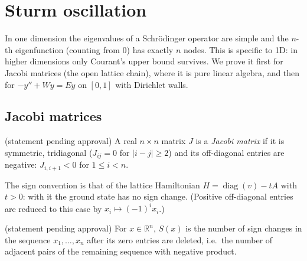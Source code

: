 \chapter{Sturm oscillation}
\label{chap:sturm}


In one dimension the eigenvalues of a Schrödinger operator are simple and the $n$-th eigenfunction (counting from
$0$) has exactly $n$ nodes. This is specific to 1D: in higher dimensions only Courant's upper bound survives. We prove
it first for Jacobi matrices (the open lattice chain), where it is pure linear algebra, and then for
$-y''+Wy=Ey$ on $[0,1]$ with Dirichlet walls.

\section{Jacobi matrices}


\begin{definition}
  \label{def:jacobi}
  (statement pending approval)
  A real $n\times n$ matrix $J$ is a \emph{Jacobi matrix} if it is symmetric, tridiagonal ($J_{ij}=0$ for
  $|i-j|\ge2$) and its off-diagonal entries are negative: $J_{i,i+1}<0$ for $1\le i<n$.
\end{definition}

The sign convention is that of the lattice Hamiltonian $H=\operatorname{diag}(v)-tA$ with $t>0$: with it the ground
state has no sign change. (Positive off-diagonal entries are reduced to this case by $x_i\mapsto(-1)^ix_i$.)

\begin{definition}
  \label{def:sign_changes}
  (statement pending approval)
  For $x\in\mathbb R^n$, $S(x)$ is the number of sign changes in the sequence $x_1,\dots,x_n$ after its zero entries
  are deleted, i.e.\ the number of adjacent pairs of the remaining sequence with negative product.
\end{definition}

